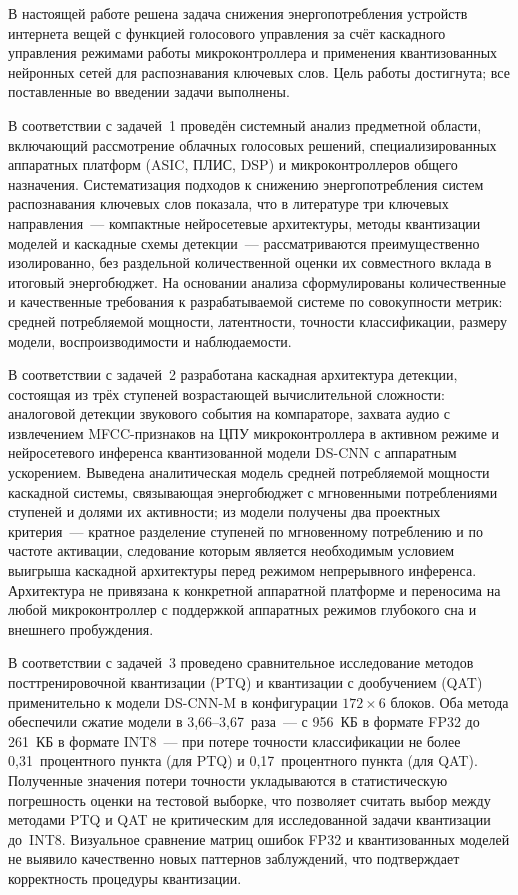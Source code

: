 
В настоящей работе решена задача снижения энергопотребления устройств
интернета вещей с функцией голосового управления за счёт каскадного
управления режимами работы микроконтроллера и применения квантизованных
нейронных сетей для распознавания ключевых слов. Цель работы достигнута;
все поставленные во введении задачи выполнены.

В соответствии с задачей~1 проведён системный анализ предметной
области, включающий рассмотрение облачных голосовых решений,
специализированных аппаратных платформ (ASIC, ПЛИС, DSP) и
микроконтроллеров общего назначения. Систематизация подходов к
снижению энергопотребления систем распознавания ключевых слов
показала, что в литературе три ключевых направления~--- компактные
нейросетевые архитектуры, методы квантизации моделей и каскадные
схемы детекции~--- рассматриваются преимущественно изолированно,
без раздельной количественной оценки их совместного вклада в
итоговый энергобюджет. На основании анализа сформулированы
количественные и качественные требования к разрабатываемой системе
по совокупности метрик: средней потребляемой мощности, латентности,
точности классификации, размеру модели, воспроизводимости и
наблюдаемости.

В соответствии с задачей~2 разработана каскадная архитектура
детекции, состоящая из трёх ступеней возрастающей вычислительной
сложности: аналоговой детекции звукового события на компараторе,
захвата аудио с извлечением MFCC-признаков на ЦПУ микроконтроллера
в активном режиме и нейросетевого инференса квантизованной модели
DS-CNN с аппаратным ускорением. Выведена аналитическая модель
средней потребляемой мощности каскадной системы, связывающая
энергобюджет с мгновенными потреблениями ступеней и долями их
активности; из модели получены два проектных
критерия~--- кратное разделение ступеней по мгновенному потреблению
и по частоте активации, следование которым является необходимым
условием выигрыша каскадной архитектуры перед режимом непрерывного
инференса. Архитектура не привязана к конкретной аппаратной
платформе и переносима на любой микроконтроллер с поддержкой
аппаратных режимов глубокого сна и внешнего пробуждения.

В соответствии с задачей~3 проведено сравнительное исследование
методов посттренировочной квантизации (PTQ) и квантизации с
дообучением (QAT) применительно к модели DS-CNN-M в конфигурации
$172 \times 6$ блоков. Оба метода обеспечили сжатие модели в
3,66--3,67~раза~--- с 956~КБ в формате FP32 до 261~КБ в формате
INT8~--- при потере точности классификации не более 0,31~процентного
пункта (для PTQ) и 0,17~процентного пункта (для QAT). Полученные
значения потери точности укладываются в статистическую погрешность
оценки на тестовой выборке, что позволяет считать выбор между
методами PTQ и QAT не критическим для исследованной задачи
квантизации до~INT8. Визуальное сравнение матриц ошибок FP32 и
квантизованных моделей не выявило качественно новых паттернов
заблуждений, что подтверждает корректность процедуры квантизации.

